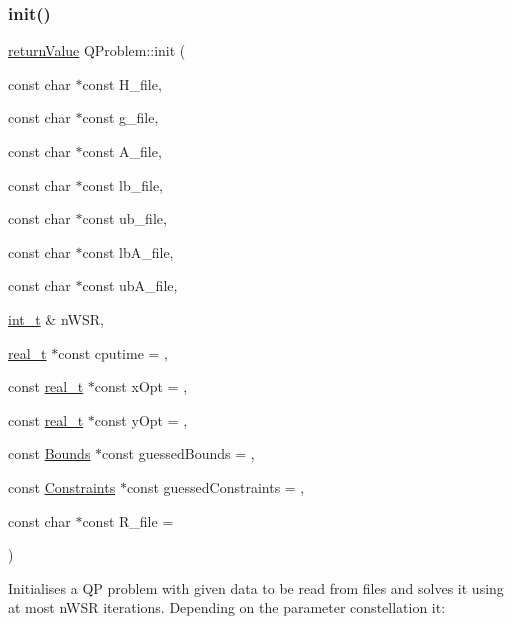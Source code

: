 \mbox{\label{class_q_problem_a7018150c5fa8f474d42516b4dece449f}} 
\subsubsection{\texorpdfstring{init()}{init()}\hspace{0.1cm}{\footnotesize\ttfamily [3/3]}}
{\footnotesize\ttfamily \hyperlink{_message_handling_8hpp_a81d556f613bfbabd0b1f9488c0fa865e}{return\+Value} Q\+Problem\+::init (\begin{DoxyParamCaption}\item[{const char $\ast$const}]{H\+\_\+file,  }\item[{const char $\ast$const}]{g\+\_\+file,  }\item[{const char $\ast$const}]{A\+\_\+file,  }\item[{const char $\ast$const}]{lb\+\_\+file,  }\item[{const char $\ast$const}]{ub\+\_\+file,  }\item[{const char $\ast$const}]{lb\+A\+\_\+file,  }\item[{const char $\ast$const}]{ub\+A\+\_\+file,  }\item[{\hyperlink{_types_8hpp_ab6fd6105e64ed14a0c9281326f05e623}{int\+\_\+t} \&}]{n\+W\+SR,  }\item[{\hyperlink{qp_o_a_s_e_s__wrapper_8h_a0d00e2b3dfadee81331bbb39068570c4}{real\+\_\+t} $\ast$const}]{cputime = {},  }\item[{const \hyperlink{qp_o_a_s_e_s__wrapper_8h_a0d00e2b3dfadee81331bbb39068570c4}{real\+\_\+t} $\ast$const}]{x\+Opt = {},  }\item[{const \hyperlink{qp_o_a_s_e_s__wrapper_8h_a0d00e2b3dfadee81331bbb39068570c4}{real\+\_\+t} $\ast$const}]{y\+Opt = {},  }\item[{const \hyperlink{class_bounds}{Bounds} $\ast$const}]{guessed\+Bounds = {},  }\item[{const \hyperlink{class_constraints}{Constraints} $\ast$const}]{guessed\+Constraints = {},  }\item[{const char $\ast$const}]{R\+\_\+file = {} }\end{DoxyParamCaption})}

Initialises a QP problem with given data to be read from files and solves it using at most n\+W\+SR iterations. Depending on the parameter constellation it\+: ~\newline

